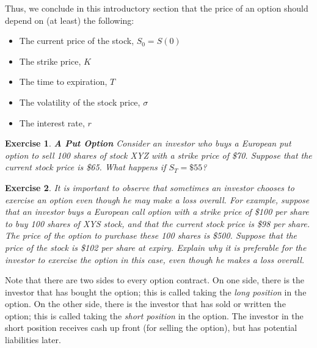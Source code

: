 \documentclass[letterpaper,10pt]{article}
\newtheorem{ex}{Exercise}
\begin{document}
Thus, we conclude in this introductory section that the price of an option should depend on (at least) the following:

\begin{itemize}

\item The current price of the stock, $S_0=S(0)$

\item The strike price, $K$

\item The time to expiration, $T$

\item The volatility of the stock price, $\sigma$

\item The interest rate, $r$

\end{itemize}



\begin{ex}{\bf A Put Option}
Consider an investor who buys a European put option to sell 100 shares of stock XYZ with a strike price of \$70.  Suppose that the current stock price is \$65.   What happens if $S_T=\$55$?



\end{ex}

\begin{ex}
It is important to observe that sometimes an investor chooses to exercise an option even though he may make a loss overall.  For example, suppose that an investor buys a European call option with a strike price of \$100 per share to buy 100 shares of XYS stock, and that the current stock price is \$98 per share.  The price of the option to purchase these 100 shares is \$500.  Suppose that the price of the stock is \$102 per share at expiry.  Explain why it is preferable for the investor to exercise the option in this case, even though he makes a loss overall.
\end{ex}






Note that there are two sides to every option contract.  On one side, there is the investor that has bought the option; this is called taking the {\em long position} in the option.  On the other side, there is the investor that has sold or written the option; this is called taking the {\em short position} in the option.  The investor in the short position receives cash up front (for selling the option), but has potential liabilities later.  
\end{document}
